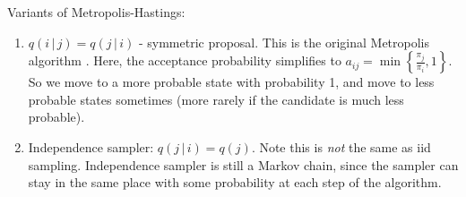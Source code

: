 \documentclass[11pt]{article}\usepackage[]{graphicx}\usepackage[]{color}
\numberwithin{algorithm}{section}
\theoremstyle{remark}
\theoremstyle{definition}
\begin{document}
Variants of Metropolis-Hastings:
\begin{enumerate}
 \item $q(i\,|\, j) = q(j\,|\, i)$ - symmetric proposal.  This is the
   original Metropolis algorithm \citep{Metropolis1953}.  Here, the acceptance probability
   simplifies to $a_{ij} = \min\left\{ \frac{\pi_j}{\pi_i}, 1 \right\}$.
   So we move to a more probable state with probability 1, and move
   to less probable states sometimes (more rarely if the candidate
   is much less probable).

 \item Independence sampler: $q(j\,|\,i) = q(j)$.  Note this
   is \emph{not} the same as iid sampling.  Independence sampler is still a Markov chain,
   since the sampler can stay in the same place with some probability at each step of 
   the algorithm.
\end{enumerate}






\end{document}
